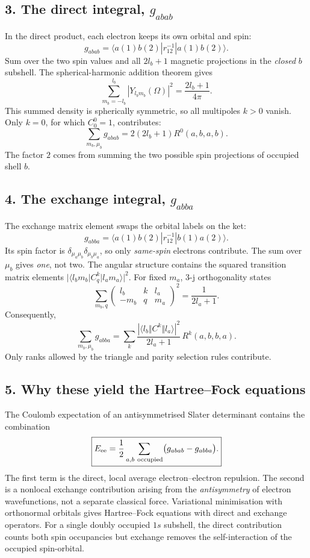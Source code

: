 \subsection*{3. The direct integral, \(g_{abab}\)}
In the direct product, each electron keeps
its own orbital and spin:
\[
g_{abab}=
\langle a(1)b(2)|r_{12}^{-1}|a(1)b(2)\rangle.
\]
Sum over the two spin values and all
\(2l_b+1\) magnetic projections in the
\emph{closed} \(b\) subshell. The
spherical-harmonic addition theorem gives
\[
\sum_{m_b=-l_b}^{l_b}
|Y_{l_bm_b}(\Omega)|^2
=\frac{2l_b+1}{4\pi}.
\]
This summed density is spherically symmetric,
so all multipoles \(k>0\) vanish. Only
\(k=0\), for which \(C^0_0=1\), contributes:
\[
\boxed{\sum_{m_b,\mu_b}g_{abab}
=2(2l_b+1)R^0(a,b,a,b).}
\tag{Johnson 3.64}
\]
The factor \(2\) comes from summing the two
possible spin projections of occupied shell \(b\).

\subsection*{4. The exchange integral, \(g_{abba}\)}
The exchange matrix element swaps the orbital
labels on the ket:
\[
g_{abba}=
\langle a(1)b(2)|r_{12}^{-1}|b(1)a(2)\rangle.
\]
Its spin factor is
\(\delta_{\mu_a\mu_b}\delta_{\mu_b\mu_a}\),
so only \emph{same-spin} electrons contribute.
The sum over \(\mu_b\) gives \emph{one}, not two.
The angular structure contains the squared
transition matrix elements
\(|\langle l_bm_b|C^k_q|l_am_a\rangle|^2\).
For fixed \(m_a\), 3-j orthogonality states
\[
\sum_{m_b,q}
\begin{pmatrix}l_b&k&l_a\\-m_b&q&m_a\end{pmatrix}^{\!2}
=\frac1{2l_a+1}.
\]
Consequently,
\[
\boxed{\sum_{m_b,\mu_b}g_{abba}
=\sum_{k}\frac{|\langle l_b\Vert C^k\Vert l_a\rangle|^2}
{2l_a+1}\,R^k(a,b,b,a).}
\tag{Johnson 3.66}
\]
Only ranks allowed by the triangle and
parity selection rules contribute.

\subsection*{5. Why these yield the Hartree--Fock equations}
The Coulomb expectation of an antisymmetrised
Slater determinant contains the combination
\[
\boxed{E_{\rm ee}=\frac12\sum_{a,b\ {\rm occupied}}
\bigl(g_{abab}-g_{abba}\bigr).}
\]
The first term is the direct, local average
electron--electron repulsion. The second is
a nonlocal exchange contribution arising
from the \emph{antisymmetry} of electron
wavefunctions, not a separate classical force.
Variational minimisation with orthonormal
orbitals gives Hartree--Fock equations with
direct and exchange operators. For a single
doubly occupied \(1s\) subshell, the direct
contribution counts both spin occupancies
but exchange removes the self-interaction
of the occupied spin-orbital.

